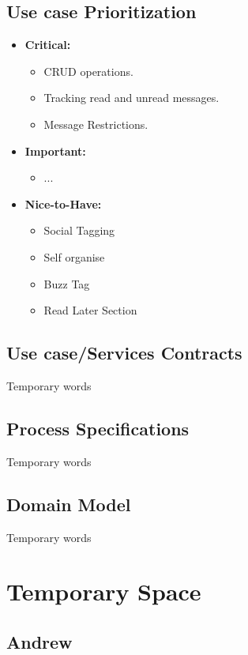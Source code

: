 \documentclass[11pt]{article}
\begin{document}
\subsection{Use case Prioritization}
\begin{itemize}
\item \textbf{Critical: }
	\begin{itemize}
		\item CRUD operations.
		\item Tracking read and unread messages.
		\item Message Restrictions.
	\end{itemize}

\item \textbf{Important: }
	\begin{itemize}
		\item ...
	\end{itemize}

\item \textbf{Nice-to-Have: }
	\begin{itemize}
		\item Social Tagging
		\item Self organise
		\item Buzz Tag
		\item Read Later Section
	\end{itemize}
\end{itemize}
\subsection{Use case/Services Contracts}
Temporary words
\subsection{Process Specifications}
Temporary words
\subsection{Domain Model}
Temporary words

\newpage
\section{Temporary Space}

\subsection{Andrew}
\end{document}
